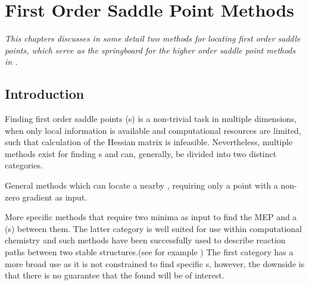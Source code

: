 \chapter{First Order Saddle Point Methods}
\label{chap:saddle-point-methods}
\textit{This chapters discusses in some detail two methods for locating first order saddle points, which serve as the springboard for the higher order saddle point methods in .}
\section{Introduction}
Finding first order saddle points (s) is a non-trivial task in multiple dimensions, when only local information is available and computational resources are limited, such that calculation of the Hessian matrix is infeasible.
Nevertheless, multiple methods exist for finding s and can, generally, be divided into two distinct categories.
\item General methods which can locate a nearby , requiring only a point with a non-zero gradient as input.
\item More specific methods that require two minima as input to find the MEP and a  (s) between them.
\een
The latter category is well suited for use within computational chemistry and such methods have been successfully used to describe reaction paths between two stable structures.(see for example \cite{double-defect-2011})
The first category has a more broad use as it is not constrained to find specific s, however, the downside is that there is no guarantee that the found  will be of interest.

\expand {}




